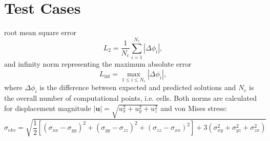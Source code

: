 \documentclass[sn-mathphys,Numbered]{sn-jnl}%
\begin{document}
\section{Test Cases}
\label{sec:test_cases}
%
%
%

root mean square error
\begin{equation}
L_2 = \frac{1}{N_{\text{c}}}\sum_{i=1}^{N_{\text{c}}} |\Delta \phi_i|,
\end{equation}
and infinity norm representing the maximum absolute error
\begin{equation}
L_{\inf} = \max_{1 \leq i \leq N_{\text{c}}} |\Delta \phi_i|,
\end{equation}
where $\Delta \phi_i$ is the difference between expected and predicted solutions and $N_{\text{c}}$ is the overall number of computational points, i.e. cells.
Both norms are calculated for displacement magnitude $|\boldsymbol{u}|=\sqrt{u_x^2+u_y^2+u_z^2}$ and von Mises stress:
\begin{equation}
\sigma_{ekv}=\sqrt{\frac{1}{2}\left[  (\sigma_{xx}-\sigma_{yy})^2+(\sigma_{yy}-\sigma_{zz})^2+(\sigma_{zz}-\sigma_{xx})^2 \right]+3\left(\sigma_{xy}^2+\sigma_{yz}^2+\sigma_{zx}^2\right)}
\end{equation}
\end{document}

